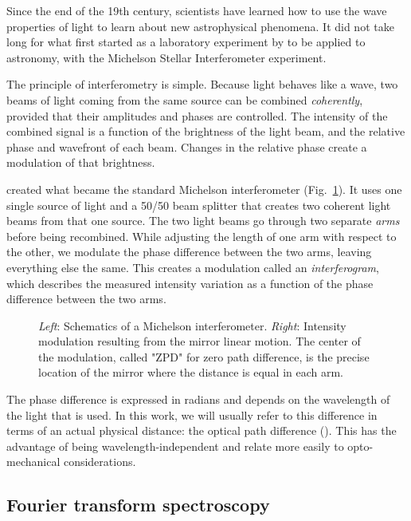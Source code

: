 Since the end of the 19th century, scientists have learned how to use the wave properties of light to learn about new astrophysical phenomena. It did not take long for what first started as a laboratory experiment by \citet{Michelson:1887wc} to be applied to astronomy, with the Michelson Stellar Interferometer experiment. 

The principle of interferometry is simple. Because light behaves like a wave, two beams of light coming from the same source can be combined \textit{coherently}, provided that their amplitudes and phases are controlled. The intensity of the combined signal is a function of the brightness of the light beam, and the relative phase and wavefront of each beam. Changes in the relative phase create a modulation of that brightness.

\citet{Michelson:1887wc} created what became the standard Michelson interferometer (Fig.~\ref{fig:michelson}). It uses one single source of light and a 50/50 beam splitter that creates two coherent light beams from that one source. The two light beams go through two separate \textit{arms} before being recombined. While adjusting the length of one arm with respect to the other, we modulate the phase difference between the two arms, leaving everything else the same. This creates a modulation called an \textit{interferogram}, which describes the measured intensity variation as a function of the phase difference between the two arms.

\begin{figure}[!h]
\centering

\caption[Michelson interferometer]{\textit{Left}: Schematics of a Michelson interferometer. \textit{Right}: Intensity modulation resulting from the mirror linear motion. The center of the modulation, called "ZPD" for zero path difference, is the precise location of the mirror where the distance is equal in each arm.}
\label{fig:michelson}
\end{figure}


The phase difference is expressed in radians and depends on the wavelength of the light that is used. In this work, we will usually refer to this difference in terms of an actual physical distance: the optical path difference (\OPD). This has the advantage of being wavelength-independent and relate more easily to opto-mechanical considerations.




\subsection{Fourier transform spectroscopy}

